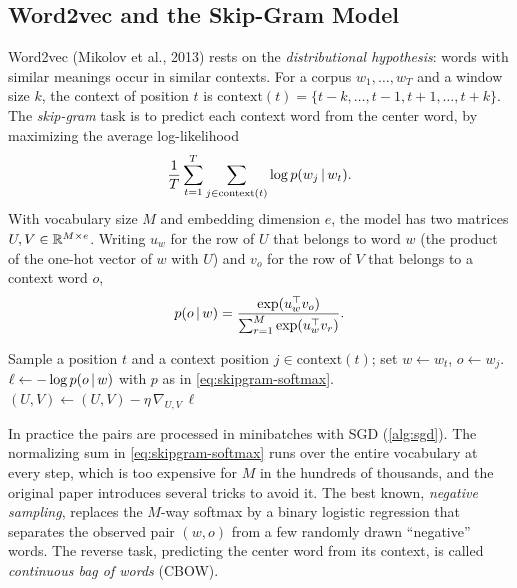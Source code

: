 \subsection{Word2vec and the Skip-Gram Model}

Word2vec (Mikolov et al., 2013) rests on the \emph{distributional hypothesis}: words with similar meanings occur in similar contexts. For a corpus $w_1,\dots,w_T$ and a window size $k$, the context of position $t$ is $\mathrm{context}(t)=\{t-k,\dots,t-1,t+1,\dots,t+k\}$. The \emph{skip-gram} task is to predict each context word from the center word, by maximizing the average log-likelihood
\begin{equation}\label{eq:skipgram}
\frac1T\sum_{t=1}^T\sum_{j\in\mathrm{context}(t)}\log p(w_j\,|\, w_t).
\end{equation}
With vocabulary size $M$ and embedding dimension $e$, the model has two matrices $U,V\in\mathbb{R}^{M\times e}$. Writing $u_w$ for the row of $U$ that belongs to word $w$ (the product of the one-hot vector of $w$ with $U$) and $v_o$ for the row of $V$ that belongs to a context word $o$,
\begin{equation}\label{eq:skipgram-softmax}
p(o\,|\, w)=\frac{\exp(u_w^{\top} v_o)}{\sum_{r=1}^M\exp(u_w^{\top} v_{r})}.
\end{equation}

\begin{algorithm}[H]
\caption{Skip-Gram Word2vec}\label{alg:skipgram}
\begin{algorithmic}[1]
  \State Sample a position $t$ and a context position $j\in\mathrm{context}(t)$; set $w\gets w_t$, $o\gets w_j$.
  \State $\ell\gets-\log p(o\,|\, w)$ with $p$ as in \eqref{eq:skipgram-softmax}.
  \State $(U,V)\gets(U,V)-\eta\,\nabla_{U,V}\,\ell$ 
\EndFor
{}
\end{algorithmic}
\end{algorithm}

In practice the pairs are processed in minibatches with SGD (\cref{alg:sgd}). The normalizing sum in \eqref{eq:skipgram-softmax} runs over the entire vocabulary at every step, which is too expensive for $M$ in the hundreds of thousands, and the original paper introduces several tricks to avoid it. The best known, \emph{negative sampling}, replaces the $M$-way softmax by a binary logistic regression that separates the observed pair $(w,o)$ from a few randomly drawn ``negative'' words. The reverse task, predicting the center word from its context, is called \emph{continuous bag of words} (CBOW).

